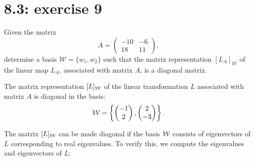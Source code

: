 \documentclass{report}
\begin{document}
\section*{8.3: exercise 9} 

Given the matrix
\[
A = \begin{pmatrix}
-10 & -6 \\
18 & 11
\end{pmatrix},
\]
determine a basis \(\mathcal{W} = \{w_1, w_2\}\) such that the matrix representation \([L_A]_{\mathcal{W}}\) of the linear map \(L_A\), associated with matrix \(A\), is a diagonal matrix.


\sol

The matrix representation $[L]_{\cal W}$ of the linear transformation $L$ associated with matrix $A$ is diagonal in the basis:
\[
{\cal W} = \left\{\begin{pmatrix} -1 \\ 2 \end{pmatrix}, \begin{pmatrix} 2 \\ -3 \end{pmatrix}\right\}.
\]

The matrix $[L]_{\cal W}$ can be made diagonal if the basis ${\cal W}$ consists of eigenvectors of $L$ corresponding to real eigenvalues. To verify this, we compute the eigenvalues and eigenvectors of $L$:
\end{document}
